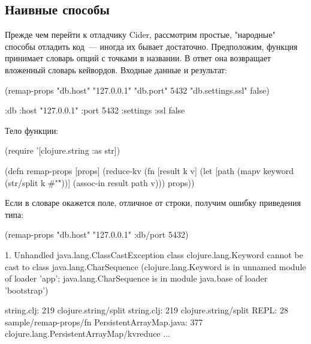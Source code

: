 \subsection{Наивные способы}

Прежде чем перейти к отладчику Cider, рассмотрим простые, "народные" способы отладить код~--- иногда их бывает достаточно. Предположим, функция принимает словарь опций с точками в названии. В ответ она возвращает вложенный словарь кейвордов. Входные данные и результат:

\begin{english}
  \begin{clojure}
(remap-props {"db.host" "127.0.0.1"
              "db.port" 5432
              "db.settings.ssl" false})

{:db
 {:host "127.0.0.1"
  :port 5432
  :settings {:ssl false}}}
  \end{clojure}
\end{english}

Тело функции:

\begin{english}
  \begin{clojure}
(require '[clojure.string :as str])

(defn remap-props [props]
  (reduce-kv
   (fn [result k v]
     (let [path
           (mapv keyword (str/split k #"\."))]
       (assoc-in result path v)))
   {}
   props))
  \end{clojure}
\end{english}

Если в словаре окажется поле, отличное от строки, получим ошибку приведения типа:

\begin{english}
  \begin{text}
(remap-props {"db.host" "127.0.0.1" :db/port 5432})

1. Unhandled java.lang.ClassCastException
   class clojure.lang.Keyword cannot be cast to class java.lang.CharSequence
   (clojure.lang.Keyword is in unnamed module of loader 'app';
   java.lang.CharSequence is in module java.base of loader 'bootstrap')

                string.clj:  219  clojure.string/split
                string.clj:  219  clojure.string/split
                      REPL:   28  sample/remap-props/fn
   PersistentArrayMap.java:  377  clojure.lang.PersistentArrayMap/kvreduce
   ...
  \end{text}
\end{english}

